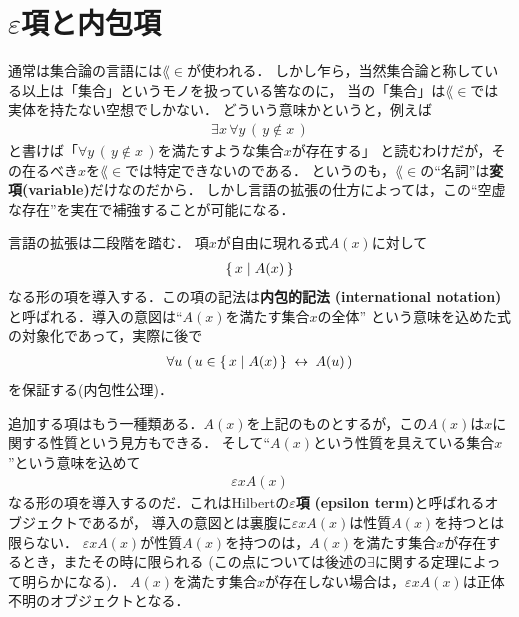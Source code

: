 \chapter{$\varepsilon$項と内包項}
	通常は集合論の言語には$\lang{\in}$が使われる．
	しかし乍ら，当然集合論と称している以上は「集合」というモノを扱っている筈なのに，
	当の「集合」は$\lang{\in}$では実体を持たない空想でしかない．
	どういう意味かというと，例えば
	\begin{align}	
		\exists x\, \forall y\, (\, y \notin x\, )
	\end{align}
	と書けば「$\forall y\, (\, y \notin x\, )$を満たすような集合$x$が存在する」
	と読むわけだが，その在るべき$x$を$\lang{\in}$では特定できないのである．
	というのも，$\lang{\in}$の``名詞''は{\bf 変項}{\bf (variable)}だけなのだから．
	しかし言語の拡張の仕方によっては，この``空虚な存在''を実在で補強することが可能になる．
	
	\begin{comment}
	...
	考えてみれば愈々不可解である．そもそも集合なるものは我々の想像の中にしかないものであって，
	その想像を紙の上に具象化したはずの``集合論''の世界においてさえ集合が虚構に追いやられているなんて，
	どうして易々と看過できようか．
	この点で，$\lang{\in}$のみで集合論を展開することには感覚的に大きな抵抗があるわけだ．
	そこで，集合を具体的なオブジェクトとして扱えるように言語を拡張しようではないか
	(と意気込んではみるものの，遍く受け入れられている{\bf ZFC}集合論に上手く馴染めない
	偏屈な異分子のたわ言，と一笑に付されるかもしれない．まあこう弱気になることも多々あるが，
	修士号のためには偏執的なこだわりだって岩をも通すのである！)．
	
	\end{comment}
	
	言語の拡張は二段階を踏む．
	項$x$が自由に現れる式$A(x)$に対して
	\begin{align}
		\left\{\, x \mid A(x)\, \right\}
	\end{align}
	なる形の項を導入する．この項の記法は{\bf 内包的記法}
	{\bf (international notation)}と呼ばれる．導入の意図は``$A(x)$を満たす集合$x$の全体''
	という意味を込めた式の対象化であって，実際に後で
	\begin{align}
		\forall u\, \left(\, u \in \left\{\, x \mid A(x)\, \right\} \hspace{0.25em}\leftrightarrow\hspace{0.25em} A(u)\, \right)
	\end{align}
	を保証する(内包性公理)．
	
	追加する項はもう一種類ある．$A(x)$を上記のものとするが，この$A(x)$は$x$に関する性質という見方もできる．
	そして``$A(x)$という性質を具えている集合$x$''という意味を込めて
	\begin{align}
		\varepsilon x A(x)
	\end{align}
	なる形の項を導入するのだ．これはHilbertの{\bf $\varepsilon$項}
	{\bf (epsilon term)}と呼ばれるオブジェクトであるが，
	導入の意図とは裏腹に$\varepsilon x A(x)$は性質$A(x)$を持つとは限らない．
	$\varepsilon x A(x)$が性質$A(x)$を持つのは，$A(x)$を満たす集合$x$が存在するとき，またその時に限られる
	(この点については後述の$\exists$に関する定理によって明らかになる)．
	$A(x)$を満たす集合$x$が存在しない場合は，$\varepsilon x A(x)$は正体不明のオブジェクトとなる．
	
